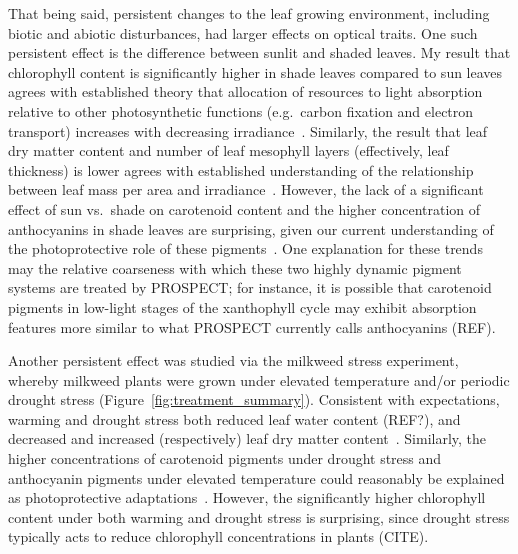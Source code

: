That being said, persistent changes to the leaf growing environment, including biotic and abiotic disturbances, had larger effects on optical traits.
One such persistent effect is the difference between sunlit and shaded leaves.
My result that chlorophyll content is significantly higher in shade leaves compared to sun leaves agrees with established theory that allocation of resources to light absorption relative to other photosynthetic functions (e.g.\ carbon fixation and electron transport) increases with decreasing irradiance~\cite{hikosaka_1995_model}.
Similarly, the result that leaf dry matter content and number of leaf mesophyll layers (effectively, leaf thickness) is lower agrees with established understanding of the relationship between leaf mass per area and irradiance~\cite{poorter_2009_causes}.
However, the lack of a significant effect of sun vs.\ shade on carotenoid content and the higher concentration of anthocyanins in shade leaves are surprising, given our current understanding of the photoprotective role of these pigments~\cite{young_1991_photoprotective,steyn_2002_anthocyanins}.
One explanation for these trends may the relative coarseness with which these two highly dynamic pigment systems are treated by PROSPECT\@;
for instance, it is possible that carotenoid pigments in low-light stages of the xanthophyll cycle may exhibit absorption features more similar to what PROSPECT currently calls anthocyanins (REF). %

Another persistent effect was studied via the milkweed stress experiment, whereby milkweed plants were grown under elevated temperature and/or periodic drought stress (Figure~\ref{fig:treatment_summary}).
Consistent with expectations, warming and drought stress both reduced leaf water content (REF?), and decreased and increased (respectively) leaf dry matter content~\cite{poorter_2009_causes}.
Similarly, the higher concentrations of carotenoid pigments under drought stress and anthocyanin pigments under elevated temperature could reasonably be explained as photoprotective adaptations~\cite{young_1991_photoprotective,steyn_2002_anthocyanins}.
However, the significantly higher chlorophyll content under both warming and drought stress is surprising, since drought stress typically acts to reduce chlorophyll concentrations in plants (CITE).

